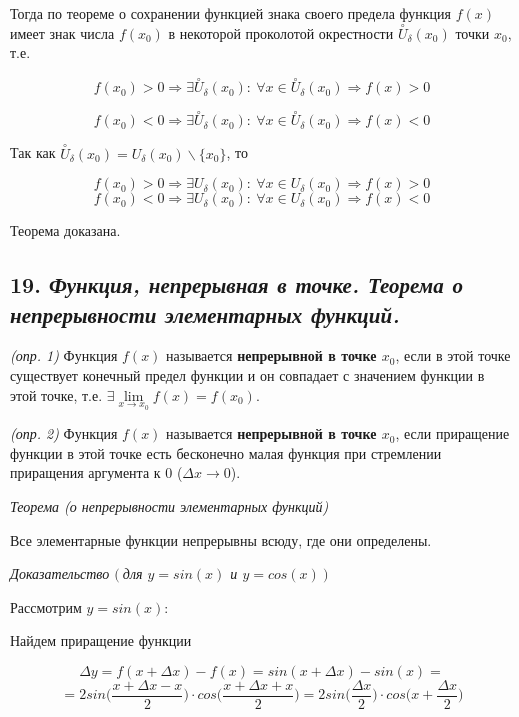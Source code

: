 Тогда по теореме о сохранении функцией знака своего предела функция $f(x)$ имеет знак числа $f(x_0)$ в некоторой проколотой окрестности $\overset{\circ}U_\delta(x_0)$ точки $x_0$, т.е.

$$
f(x_0) > 0 \Rightarrow \exists \overset{\circ}U_\delta(x_0):\ \forall x \in \overset{\circ}U_\delta(x_0)\Rightarrow f(x) > 0 
$$

$$
f(x_0) < 0 \Rightarrow \exists \overset{\circ}U_\delta(x_0):\ \forall x \in \overset{\circ}U_\delta(x_0)\Rightarrow f(x) < 0 
$$

Так как $\overset{\circ}U_\delta(x_0) = U_\delta(x_0) \backslash \{x_0\}$, то

$$
f(x_0) > 0 \Rightarrow \exists U_\delta(x_0):\ \forall x \in U_\delta(x_0)\Rightarrow f(x) > 0 
$$ $$
f(x_0) < 0 \Rightarrow \exists U_\delta(x_0):\ \forall x \in U_\delta(x_0)\Rightarrow f(x) < 0 
$$

Теорема доказана.
\newpage 
\subsection*{19. \textit{Функция, непрерывная в точке. Теорема о непрерывности элементарных функций.}}

\textit{(опр. 1)} Функция $f(x)$ называется \textbf{непрерывной в точке $x_0$}, если в этой точке существует конечный предел функции и он совпадает с значением функции в этой точке, т.е. $\exists \lim\limits_{x \to x_0}f(x) = f(x_0)$.

\textit{(опр. 2)} Функция $f(x)$ называется \textbf{непрерывной в точке $x_0$}, если приращение функции в этой точке есть бесконечно малая функция при стремлении приращения аргумента к 0 ($\Delta x \rightarrow 0$).

\textit{Теорема (о непрерывности элементарных функций)}

Все элементарные функции непрерывны всюду, где они определены.
\vspace*{20pt} 

\textit{Доказательство $(\ $для $y = sin(x)$ и $y = cos( x)\ )$}
\vspace*{20pt} 

Рассмотрим $y = sin(x)$:

Найдем приращение функции

$$
\Delta y = f(x + \Delta x) - f(x) = sin(x + \Delta x) - sin(x) =
$$ $$
= 2sin{\Big(}\dfrac{x + \Delta x - x}{2}{\Big)}\cdot cos\Big(\dfrac{x + \Delta x + x}{2}{\Big)} = 2sin{\Big(}\dfrac{\Delta x}{2}{\Big)}\cdot cos\Big(x + \dfrac{ \Delta x }{2}{\Big)}
$$

